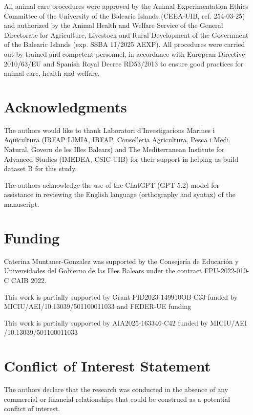 \documentclass[utf8]{FrontiersinHarvard} %
\begin{document}
All animal care procedures were approved by the Animal Experimentation Ethics Committee of the University of the Balearic Islands (CEEA-UIB, ref. 254-03-25) and authorized by the Animal Health and Welfare Service of the General Directorate for Agriculture, Livestock and Rural Development of the Government of the Balearic Islands (exp. SSBA 11/2025 AEXP). All procedures were carried out by trained and competent personnel, in accordance with European Directive 2010/63/EU and Spanish Royal Decree RD53/2013 to ensure good practices for animal care, health and welfare.


\section*{Acknowledgments}
The authors would like to thank Laboratori d’Investigacions Marines i Aqüicultura (IRFAP LIMIA, IRFAP, Conselleria Agricultura, Pesca i Medi Natural, Govern de les Illes Balears) and The Mediterranean Institute for Advanced Studies (IMEDEA, CSIC-UIB) for their support in helping us build dataset B for this study.

The authors acknowledge the use of the ChatGPT (GPT-5.2) model for assistance in reviewing the English language (orthography and syntax) of the manuscript.



\section*{Funding}
Caterina Muntaner-Gonzalez was supported by the Consejería de Educación y Universidades del Gobierno de las Illes Balears under the contract FPU-2022-010-C CAIB 2022. 

This work is partially supported by Grant PID2023-149910OB-C33 funded by \\ MICIU/AEI/10.13039/501100011033 and FEDER-UE funding 

This work is partially supported by AIA2025-163346-C42 funded by MICIU/AEI /10.13039/501100011033 



\section*{Conflict of Interest Statement}
The authors declare that the research was conducted in the absence of any commercial or financial relationships that could be construed as a potential conflict of interest.
\end{document}
